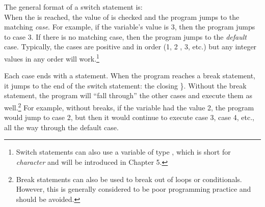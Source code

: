 The general format of a switch statement is:\\
When the  is reached, the value of  is checked and the program jumps to the matching \emph{case}.  For example, if the variable's value is 3, then the program jumps to case 3.  If there is no matching case, then the program jumps to the \emph{default} case.  Typically, the cases are positive and in order (1, 2 , 3, etc.) but any integer values in any order will work.\footnote{Switch statements can also use a variable of type , which is short for \emph{character} and will be introduced in Chapter 5.} 

Each case ends with a  statement.  When the program reaches a break statement, it jumps to the end of the switch statement: the closing \}.  Without the break statement, the program will ``fall through'' the other cases and execute them as well.\footnote{Break statements can also be used to break out of loops or conditionals.  However, this is generally considered to be poor programming practice and should be avoided.}  For example, without breaks, if the variable had the value 2, the program would jump to case 2, but then it would continue to execute case 3, case 4, etc., all the way through the default case.  

